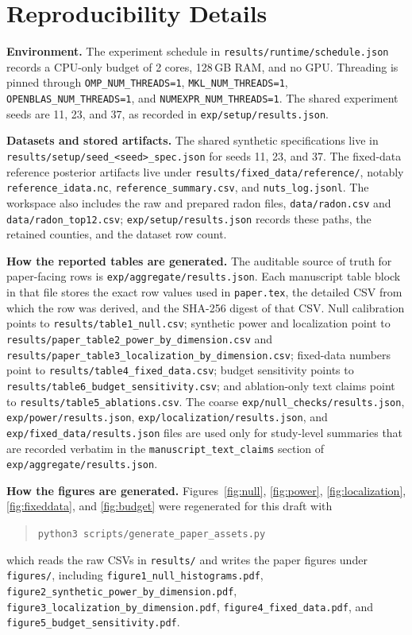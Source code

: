 \documentclass[10pt,twocolumn]{article}
\newcommand{\1}{\mathbf{1}}
\begin{document}
\appendix
\section{Reproducibility Details}
\label{sec:appendix_repro}
\textbf{Environment.} The experiment schedule in \texttt{results/runtime/schedule.json} records a CPU-only budget of 2 cores, 128\,GB RAM, and no GPU. Threading is pinned through \texttt{OMP\_NUM\_THREADS=1}, \texttt{MKL\_NUM\_THREADS=1}, \texttt{OPENBLAS\_NUM\_THREADS=1}, and \texttt{NUMEXPR\_NUM\_THREADS=1}. The shared experiment seeds are 11, 23, and 37, as recorded in \texttt{exp/setup/results.json}.

\textbf{Datasets and stored artifacts.} The shared synthetic specifications live in \texttt{results/setup/seed\_<seed>\_spec.json} for seeds 11, 23, and 37. The fixed-data reference posterior artifacts live under \texttt{results/fixed\_data/reference/}, notably \texttt{reference\_idata.nc}, \texttt{reference\_summary.csv}, and \texttt{nuts\_log.jsonl}. The workspace also includes the raw and prepared radon files, \texttt{data/radon.csv} and \texttt{data/radon\_top12.csv}; \texttt{exp/setup/results.json} records these paths, the retained counties, and the dataset row count.

\textbf{How the reported tables are generated.} The auditable source of truth for paper-facing rows is \texttt{exp/aggregate/results.json}. Each manuscript table block in that file stores the exact row values used in \texttt{paper.tex}, the detailed CSV from which the row was derived, and the SHA-256 digest of that CSV. Null calibration points to \texttt{results/table1\_null.csv}; synthetic power and localization point to \texttt{results/paper\_table2\_power\_by\_dimension.csv} and \texttt{results/paper\_table3\_localization\_by\_dimension.csv}; fixed-data numbers point to \texttt{results/table4\_fixed\_data.csv}; budget sensitivity points to \texttt{results/table6\_budget\_sensitivity.csv}; and ablation-only text claims point to \texttt{results/table5\_ablations.csv}. The coarse \texttt{exp/null\_checks/results.json}, \texttt{exp/power/results.json}, \texttt{exp/localization/results.json}, and \texttt{exp/fixed\_data/results.json} files are used only for study-level summaries that are recorded verbatim in the \texttt{manuscript\_text\_claims} section of \texttt{exp/aggregate/results.json}.

\textbf{How the figures are generated.} Figures~\ref{fig:null}, \ref{fig:power}, \ref{fig:localization}, \ref{fig:fixeddata}, and \ref{fig:budget} were regenerated for this draft with
\begin{quote}
\texttt{python3 scripts/generate\_paper\_assets.py}
\end{quote}
which reads the raw CSVs in \texttt{results/} and writes the paper figures under \texttt{figures/}, including \texttt{figure1\_null\_histograms.pdf}, \texttt{figure2\_synthetic\_power\_by\_dimension.pdf}, \texttt{figure3\_localization\_by\_dimension.pdf}, \texttt{figure4\_fixed\_data.pdf}, and \texttt{figure5\_budget\_sensitivity.pdf}.
\end{document}
